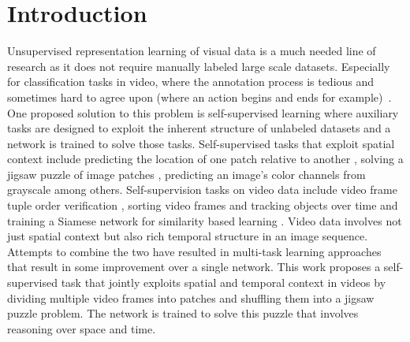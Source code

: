 \documentclass[10pt,twocolumn,letterpaper]{article}
\begin{document}
\section{Introduction}

Unsupervised representation learning of visual data is a much needed line of research as it does not require manually labeled large scale datasets. Especially for classification tasks in video, where the annotation process is tedious and sometimes hard to agree upon (where an action begins and ends for example)~\cite{sigurdsson2017actions}. One proposed solution to this problem is self-supervised learning where auxiliary tasks are designed to exploit the inherent structure of unlabeled datasets and a network is trained to solve those tasks. Self-supervised tasks that exploit spatial context include predicting the location of one patch relative to another \cite{doersch2015unsupervised}, solving a jigsaw puzzle of image patches \cite{noroozi2016unsupervised}, predicting an image's color channels from grayscale \cite{zhang2016colorful,larsson2016learning} among others. Self-supervision tasks on video data include video frame tuple order verification \cite{misra2016shuffle}, sorting video frames \cite{lee2017unsupervised} and tracking objects over time and training a Siamese network for similarity based learning \cite{wang2015unsupervised}. Video data involves not just spatial context but also rich temporal structure in an image sequence. Attempts to combine the two have resulted in multi-task learning approaches \cite{doersch2017multi} that result in some improvement over a single network. This work proposes a self-supervised task that jointly exploits spatial and temporal context in videos by dividing multiple video frames into patches and shuffling them into a jigsaw puzzle problem. The network is trained to solve this puzzle that involves reasoning over space and time.
\end{document}
